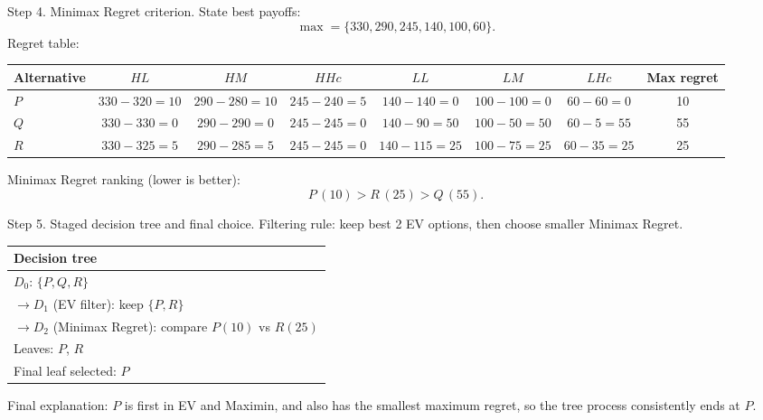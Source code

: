 \begin{ExamProblems}
		Step 4. Minimax Regret criterion.
		State best payoffs:
		\[
		\max=\{330,290,245,140,100,60\}.
		\]
		Regret table:
		\begin{center}
			\begin{tabular}{l c c c c c c c}
				\toprule
				Alternative & $HL$ & $HM$ & $HHc$ & $LL$ & $LM$ & $LHc$ & Max regret \\
				\midrule
				$P$ & $330-320=10$ & $290-280=10$ & $245-240=5$ & $140-140=0$ & $100-100=0$ & $60-60=0$ & 10 \\
				$Q$ & $330-330=0$ & $290-290=0$ & $245-245=0$ & $140-90=50$ & $100-50=50$ & $60-5=55$ & 55 \\
				$R$ & $330-325=5$ & $290-285=5$ & $245-245=0$ & $140-115=25$ & $100-75=25$ & $60-35=25$ & 25 \\
				\bottomrule
			\end{tabular}
		\end{center}
		Minimax Regret ranking (lower is better):
		\[
		P\,(10)>R\,(25)>Q\,(55).
		\]

		Step 5. Staged decision tree and final choice.
		Filtering rule: keep best 2 EV options, then choose smaller Minimax Regret.
		\begin{center}
			\begin{tabular}{l}
				\toprule
				Decision tree \\
				\midrule
				$D_0$: $\{P,Q,R\}$ \\
				$\rightarrow D_1$ (EV filter): keep $\{P,R\}$ \\
				$\rightarrow D_2$ (Minimax Regret): compare $P(10)$ vs $R(25)$ \\
				Leaves: $P$, $R$ \\
				Final leaf selected: $P$ \\
				\bottomrule
			\end{tabular}
		\end{center}
		Final explanation: $P$ is first in EV and Maximin, and also has the smallest maximum regret, so the tree process consistently ends at $P$.

		\newpage
		\item

\end{ExamProblems}
